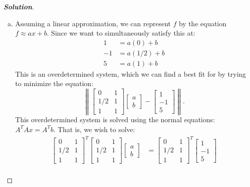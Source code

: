 \documentclass[11pt]{article}
\newenvironment{solution}{%
  \begin{proof}[\textbf{Solution}]$ $\par\nobreak\ignorespaces
}{%
  \end{proof}
}
\theoremstyle{definition}
\begin{document}
\begin{solution}
\begin{enumerate}[(a)]
\item Assuming a linear approximation, we can represent $f$ by the equation $f \approx ax + b$. Since we want to simultaneously satisfy this at:
\begin{align*}
    1 &= a(0) + b \\
    -1 &= a(1/2) + b \\
    5 &= a(1) + b
\end{align*}
This is an overdetermined system, which we can find a best fit for by trying to minimize the equation:
$$\left\|\begin{bmatrix*}0 & 1 \\ 1/2 & 1 \\ 1 & 1\end{bmatrix*}\begin{bmatrix*}a \\ b\end{bmatrix*} - \begin{bmatrix*}1 \\ - 1 \\ 5\end{bmatrix*}\right\|.$$
This overdetermined system is solved using the normal equations: $A^T A x = A^T b$. That is, we wish to solve:
\begin{align*}
    \begin{bmatrix*}0 & 1 \\ 1/2 & 1 \\ 1 & 1\end{bmatrix*}^T\begin{bmatrix*}0 & 1 \\ 1/2 & 1 \\ 1 & 1\end{bmatrix*}\begin{bmatrix*}a \\ b\end{bmatrix*} &= \begin{bmatrix*}0 & 1 \\ 1/2 & 1 \\ 1 & 1\end{bmatrix*}^T \begin{bmatrix*}1 \\ - 1 \\ 5\end{bmatrix*} \\

\end{align*}
\end{enumerate}
\end{solution}
\end{document}
